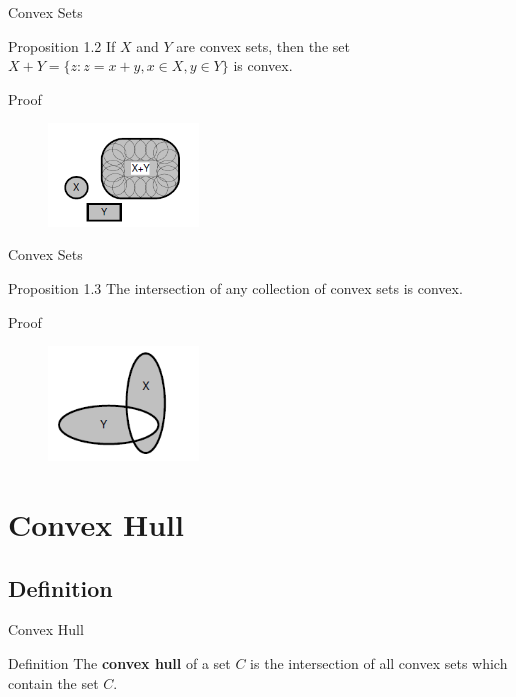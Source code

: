 \documentclass{beamer}
\begin{document}
\begin{frame}{Convex Sets}
\begin{block}{Proposition 1.2}
If $X$ and $Y$ are convex sets, then the set \\
$X + Y = \lbrace z : z = x + y, x \in X, y \in Y \rbrace$ is convex.
\end{block}
\begin{block}{Proof}
\begin{figure}[h]
\includegraphics[width=4cm]{picture3}
\end{figure}
\end{block}
\end{frame}

\begin{frame}{Convex Sets}
\begin{block}{Proposition 1.3}
The intersection of any collection of convex sets is convex.
\end{block}
\begin{block}{Proof}
\begin{figure}[h]
\includegraphics[width=4cm]{picture4}
\end{figure}
\end{block}
\end{frame}

\section{Convex Hull}
\subsection{Definition}
\begin{frame}{Convex Hull}
\begin{block}{Definition}
The \textbf{convex hull} of a set $C$ is the intersection of all convex sets which contain the set $C$. 
\end{block}
\end{frame}
\end{document}

